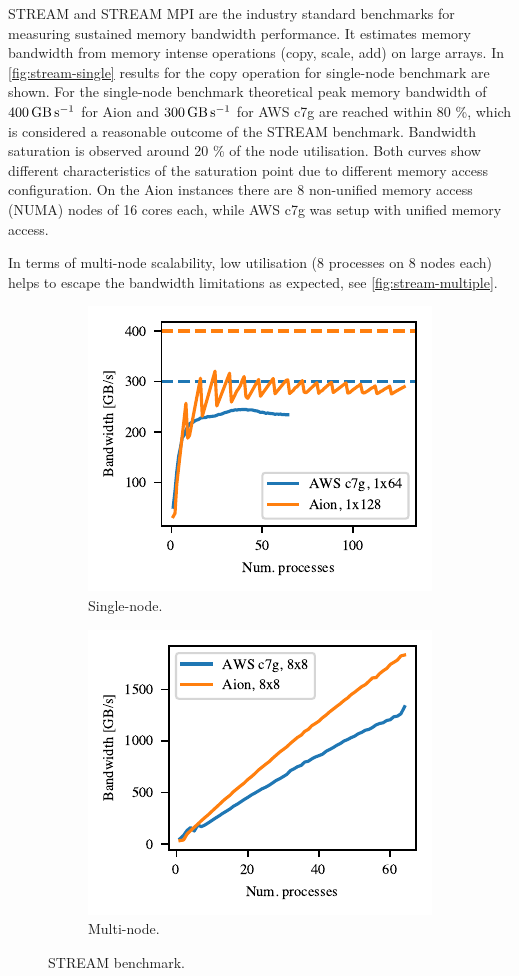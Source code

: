 STREAM and STREAM MPI \citep{McCalpin1995,McCalpin2007} are the industry standard
benchmarks for measuring sustained memory bandwidth performance. It estimates
memory bandwidth from memory intense operations (copy, scale, add) on large
arrays. In \autoref{fig:stream-single} results for the copy operation for
single-node benchmark are shown. For the single-node benchmark theoretical peak
memory bandwidth of $\SI{400}{\giga\byte\per\second}$ for Aion and
$\SI{300}{\giga\byte\per\second}$ for AWS c7g are reached within 80 \%, which is
considered a reasonable outcome of the STREAM benchmark. Bandwidth saturation is
observed around 20 \% of the node utilisation. Both curves show different
characteristics of the saturation point due to different memory access
configuration. On the Aion instances there are 8 non-unified memory access
(NUMA) nodes of 16 cores each, while AWS c7g was setup with unified memory
access.

In terms of multi-node scalability, low utilisation (8 processes on 8 nodes
each) helps to escape the bandwidth limitations as expected, see
\autoref{fig:stream-multiple}.

\begin{figure}
    \begin{subfigure}{.5\textwidth}
        \includegraphics{chapters/chp1/graphics/stream_plots/stream_single_node.pdf}
        \caption{Single-node.}
        \label{fig:stream-single}
    \end{subfigure}%
    \begin{subfigure}{.5\textwidth}
        \includegraphics{chapters/chp1/graphics/stream_plots/stream_multi_node.pdf}
        \caption{Multi-node.}
        \label{fig:stream-multiple}
    \end{subfigure}
    \caption{STREAM benchmark.}
\end{figure}

